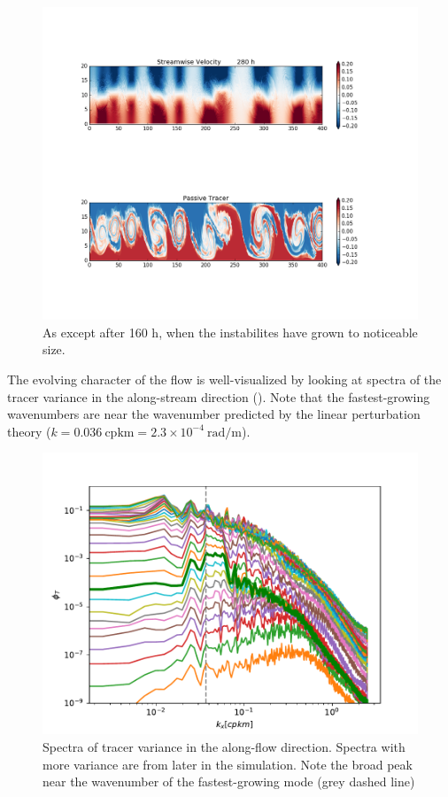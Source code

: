 \documentclass[11pt]{article}
\begin{document}
\begin{figure}[hbtp]
  \begin{center}
    \includegraphics[width=5in]{images/ChanPar040001008000}
  \end{center}
  \caption{As  except after 160 h, when the instabilites
have grown to noticeable size.}
  \label{fig:ChanPar03}
\end{figure}
   
\clearpage

The evolving character of the flow is well-visualized by looking at spectra of
the tracer variance in the along-stream direction (). 
Note that the fastest-growing wavenumbers are near the wavenumber predicted by
the linear perturbation theory ($k = 0.036\ \mathrm{cpkm} = 2.3\times10^{-4}\
\mathrm{rad/m}$).

\begin{figure}[hbtp]
  \begin{center}
    \includegraphics[width=5in]{images/ShearSpectra.pdf}
  \end{center}
  \caption{Spectra of tracer variance in the along-flow direction. Spectra with
more variance are from later in the simulation.  Note the broad peak near the
wavenumber of the fastest-growing mode (grey dashed line)}
  \label{fig:ShearSpectra}
\end{figure}
\end{document}
